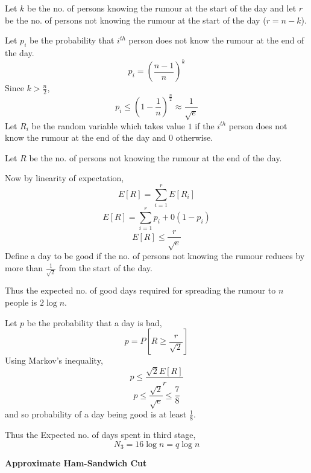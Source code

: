 \documentclass[a4paper]{article}
\begin{document}
Let $k$ be the no. of persons knowing the rumour at the start of the day and let $r$ be the no. of persons not knowing the rumour at the start of the day ($r = n-k$).

Let $p_i$ be the probability that $i^{th}$ person does not know the rumour at the end of the day.
$$p_i = \left(\frac{n-1}{n}\right)^k$$
Since $k > \frac{n}{2}$,
$$p_i \leq \left(1 - \frac{1}{n}\right)^{\frac{n}{2}} \approx \frac{1}{\sqrt{e}}$$
Let $R_i$ be the random variable which takes value $1$ if the $i^{th}$ person does not know the rumour at the end of the day and $0$ otherwise.

Let $R$ be the no. of persons not knowing the rumour at the end of the day.

Now by linearity of expectation,
$$E[R] = \sum_{i=1}^r E[R_i]$$
$$E[R] = \sum_{i=1}^r p_i + 0(1- p_i)$$
$$E[R] \leq \frac{r}{\sqrt{e}}$$
Define a day to be good if the no. of persons not knowing the rumour reduces by more than $\frac{1}{\sqrt{2}}$ from the start of the day.

Thus the expected no. of good days required for spreading the rumour to $n$ people is $2\log n$.

Let $p$ be the probability that a day is bad,
$$p = P\left[R \geq \frac{r}{\sqrt{2}}\right]$$
Using Markov's inequality,
$$p \leq \frac{\sqrt{2}E[R]}{r}$$
$$p \leq \frac{\sqrt{2}}{\sqrt{e}} \leq \frac{7}{8}$$
and so probability of a day being good is at least $\frac{1}{8}$.

Thus the Expected no. of days spent in third stage, $$N_3 = 16\log n = q \log n$$

\pagebreak
\begin{question}[]
\textbf{Approximate Ham-Sandwich Cut}

\end{question}
\end{document}
